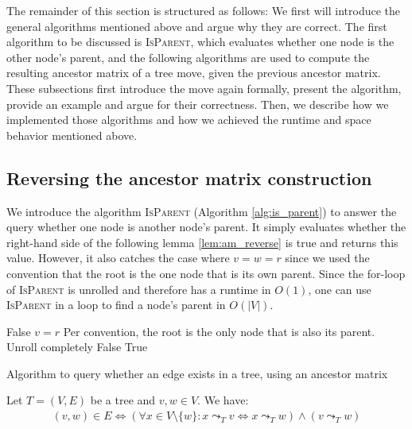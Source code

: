 The remainder of this section is structured as follows: We first will introduce the general algorithms mentioned above and argue why they are correct. The first algorithm to be discussed is \textsc{IsParent}, which evaluates whether one node is the other node's parent, and the following algorithms are used to compute the resulting ancestor matrix of a tree move, given the previous ancestor matrix. These subsections first introduce the move again formally, present the algorithm, provide an example and argue for their correctness. Then, we describe how we implemented those algorithms and how we achieved the runtime and space behavior mentioned above.

\subsection{Reversing the ancestor matrix construction}

We introduce the algorithm \textsc{IsParent} (Algorithm \ref{alg:is_parent}) to answer the query whether one node is another node's parent. It simply evaluates whether the right-hand side of the following lemma \ref{lem:am_reverse} is true and returns this value. However, it also catches the case where $v = w = r$ since we used the convention that the root is the one node that is its own parent. Since the for-loop of \textsc{IsParent} is unrolled and therefore has a runtime in $O(1)$, one can use \textsc{IsParent} in a loop to find a node's parent in $O(|V|)$.

\begin{algorithm}
    \begin{algorithmic}[1]
                \State \Return False
            \EndIf
                \State \Return $v = r$ \Comment Per convention, the root is the only node that is also its parent.
            \EndIf
             \Comment Unroll completely
                    \State \Return False
                \EndIf
            \EndFor
            \State \Return True
        \EndFunction
    \end{algorithmic}
    \caption{Algorithm to query whether an edge exists in a tree, using an ancestor matrix}
    \label{alg:is_parent}
\end{algorithm}

\begin{lemma}
    \label{lem:am_reverse}
    Let $T = (V, E)$ be a tree and $v, w \in V$. We have:
    \begin{align*}
        (v, w) \in E \Leftrightarrow (\forall x \in V \setminus \{w\}: x \leadsto_T v \Leftrightarrow x \leadsto_T w) \wedge (v \leadsto_T w)
    \end{align*}
\end{lemma}

